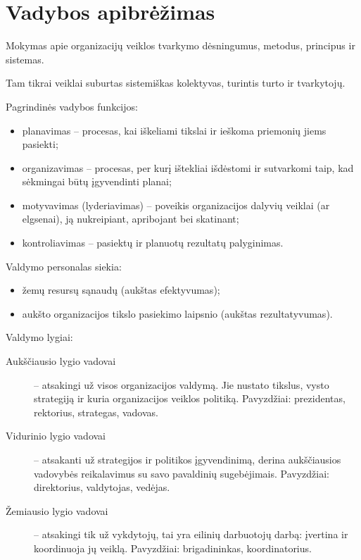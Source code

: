\chapter{Vadybos apibrėžimas}

\begin{defn}[Vadyba]
  Mokymas apie organizacijų veiklos tvarkymo dėsningumus, metodus,
  principus ir sistemas.
\end{defn}

\begin{defn}[Organizacija]
  Tam tikrai veiklai suburtas sistemiškas kolektyvas, turintis turto ir
  tvarkytojų.
\end{defn}

Pagrindinės vadybos funkcijos:
\begin{itemize}
  \item planavimas – procesas, kai iškeliami tikslai ir ieškoma
    priemonių jiems pasiekti;
  \item organizavimas – procesas, per kurį ištekliai išdėstomi
    ir sutvarkomi taip, kad sėkmingai būtų įgyvendinti planai;
  \item motyvavimas (lyderiavimas) – poveikis organizacijos dalyvių
    veiklai (ar elgsenai), ją nukreipiant, apribojant bei
    skatinant;
  \item kontroliavimas – pasiektų ir planuotų rezultatų palyginimas.
\end{itemize}

Valdymo personalas siekia:
\begin{itemize}
  \item žemų resursų sąnaudų (aukštas efektyvumas);
  \item aukšto organizacijos tikslo pasiekimo laipsnio (aukštas
  rezultatyvumas).
\end{itemize}

Valdymo lygiai:
\begin{description}
  \item[Aukščiausio lygio vadovai] – atsakingi už visos organizacijos
    valdymą. Jie nustato tikslus, vysto strategiją ir kuria organizacijos
    veiklos politiką. Pavyzdžiai: prezidentas, rektorius, strategas,
    vadovas.
  \item[Vidurinio lygio vadovai] – atsakanti už strategijos ir politikos
    įgyvendinimą, derina aukščiausios vadovybės reikalavimus su savo
    pavaldinių sugebėjimais. Pavyzdžiai: direktorius, valdytojas,
    vedėjas.
  \item[Žemiausio lygio vadovai] – atsakingi tik už vykdytojų, tai yra
    eilinių darbuotojų darbą: įvertina ir koordinuoja jų veiklą.
    Pavyzdžiai: brigadininkas, koordinatorius.
\end{description}

